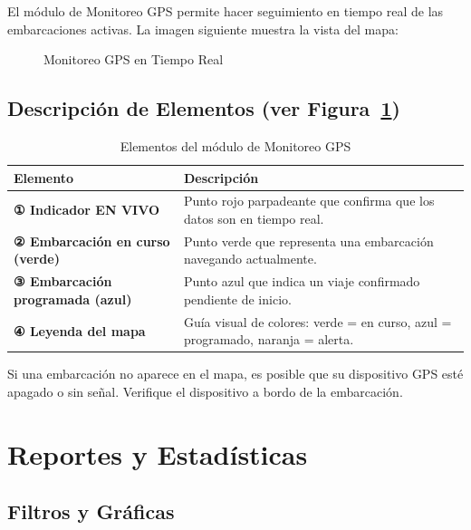 \documentclass[12pt,a4paper]{report}
\begin{document}
El módulo de Monitoreo GPS permite hacer seguimiento en tiempo real de las embarcaciones activas. La imagen siguiente muestra la vista del mapa:

\begin{figure}[H]
  \centering
  \fbox{\rule{0pt}{4cm}\hspace{10cm}}
  \caption{Monitoreo GPS en Tiempo Real}
  \label{fig:gps}
\end{figure}

\section{Descripción de Elementos (ver Figura~\ref{fig:gps})}

\begin{table}[H]
  \centering
  \renewcommand{\arraystretch}{1.4}
  \begin{tabularx}{\textwidth}{@{}L{5.5cm} X@{}}
    \toprule
    \textbf{Elemento} & \textbf{Descripción} \\
    \midrule
    \textbf{① Indicador EN VIVO} & Punto rojo parpadeante que confirma que los datos son en tiempo real. \\
    \textbf{② Embarcación en curso (verde)} & Punto verde que representa una embarcación navegando actualmente. \\
    \textbf{③ Embarcación programada (azul)} & Punto azul que indica un viaje confirmado pendiente de inicio. \\
    \textbf{④ Leyenda del mapa} & Guía visual de colores: verde = en curso, azul = programado, naranja = alerta. \\
    \bottomrule
  \end{tabularx}
  \caption{Elementos del módulo de Monitoreo GPS}
\end{table}

\begin{notabox}
Si una embarcación no aparece en el mapa, es posible que su dispositivo GPS esté apagado o sin señal. Verifique el dispositivo a bordo de la embarcación.
\end{notabox}

\chapter{Reportes y Estadísticas}

\section{Filtros y Gráficas}
\end{document}
